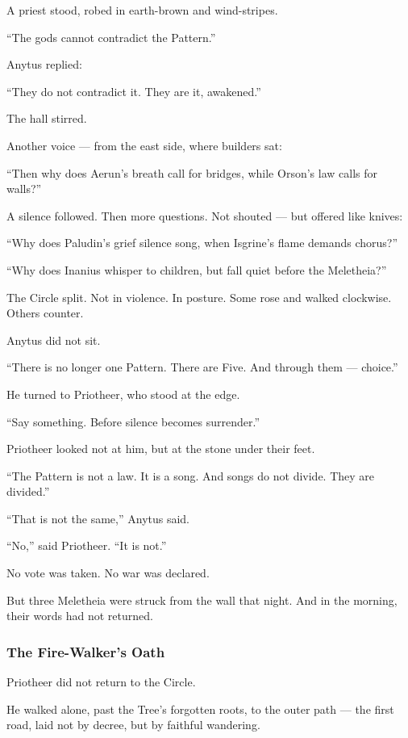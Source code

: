 \documentclass[12pt]{article}
\begin{document}
A priest stood, robed in earth-brown and wind-stripes.

 “The gods cannot contradict the Pattern.”

Anytus replied:

 “They do not contradict it. They are it, awakened.”

The hall stirred.

Another voice — from the east side, where builders sat:

 “Then why does Aerun’s breath call for bridges,  
 while Orson’s law calls for walls?”

A silence followed.  
Then more questions.  
Not shouted — but offered like knives:

 “Why does Paludin’s grief silence song,  
 when Isgrine’s flame demands chorus?”

 “Why does Inanius whisper to children,  
 but fall quiet before the Meletheia?”

The Circle split.  
Not in violence.  
In posture.  
Some rose and walked clockwise.  
Others counter.

Anytus did not sit.

 “There is no longer one Pattern.  
 There are Five.  
 And through them — choice.”

He turned to Priotheer, who stood at the edge.

 “Say something. Before silence becomes surrender.”

Priotheer looked not at him,  
but at the stone under their feet.

 “The Pattern is not a law.  
 It is a song.  
 And songs do not divide.  
 They are divided.”

 “That is not the same,” Anytus said.

 “No,” said Priotheer. “It is not.”

No vote was taken.  
No war was declared.

But three Meletheia were struck from the wall that night.  
And in the morning, their words had not returned.

\dotfill

\subsubsection*{The Fire-Walker's Oath}

Priotheer did not return to the Circle.

He walked alone, past the Tree’s forgotten roots,  
to the outer path — the first road, laid not by decree, but by faithful wandering.
\end{document}
